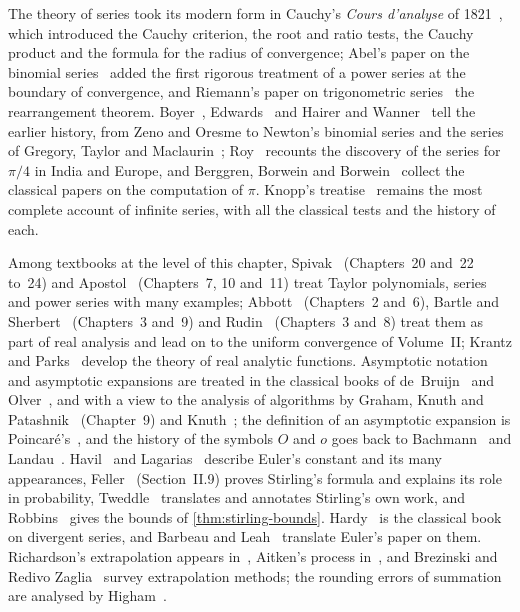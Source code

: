 The theory of series took its modern form in Cauchy's \emph{Cours d'analyse} of 1821~\cite{cauchy1821}, which introduced the Cauchy criterion, the root and ratio tests, the Cauchy product and the formula for the radius of convergence; Abel's paper on the binomial series~\cite{abel1826} added the first rigorous treatment of a power series at the boundary of convergence, and Riemann's paper on trigonometric series~\cite{riemann1867} the rearrangement theorem. Boyer~\cite{boyer1959}, Edwards~\cite{edwards1979} and Hairer and Wanner~\cite{hairer1996analysis} tell the earlier history, from Zeno and Oresme to Newton's binomial series and the series of Gregory, Taylor and Maclaurin~\cite{taylor1715,maclaurin1742}; Roy~\cite{roy1990} recounts the discovery of the series for $\pi/4$ in India and Europe, and Berggren, Borwein and Borwein~\cite{berggren2004pi} collect the classical papers on the computation of $\pi$. Knopp's treatise~\cite{knopp1990} remains the most complete account of infinite series, with all the classical tests and the history of each.

Among textbooks at the level of this chapter, Spivak~\cite{spivak2008calculus} (Chapters~20 and~22 to~24) and Apostol~\cite{apostol1967calculus} (Chapters~7, 10 and~11) treat Taylor polynomials, series and power series with many examples; Abbott~\cite{abbott2015} (Chapters~2 and~6), Bartle and Sherbert~\cite{bartle2011} (Chapters~3 and~9) and Rudin~\cite{rudin1976} (Chapters~3 and~8) treat them as part of real analysis and lead on to the uniform convergence of Volume~II; Krantz and Parks~\cite{krantz2002primer} develop the theory of real analytic functions. Asymptotic notation and asymptotic expansions are treated in the classical books of de~Bruijn~\cite{debruijn1981} and Olver~\cite{olver1997asymptotics}, and with a view to the analysis of algorithms by Graham, Knuth and Patashnik~\cite{graham1994concrete} (Chapter~9) and Knuth~\cite{knuth1976bigomega,knuth1997taocp1}; the definition of an asymptotic expansion is Poincar\'e's~\cite{poincare1886}, and the history of the symbols $O$ and $o$ goes back to Bachmann~\cite{bachmann1894} and Landau~\cite{landau1909}. Havil~\cite{havil2003gamma} and Lagarias~\cite{lagarias2013gamma} describe Euler's constant and its many appearances, Feller~\cite{feller1968} (Section~II.9) proves Stirling's formula and explains its role in probability, Tweddle~\cite{tweddle2003} translates and annotates Stirling's own work, and Robbins~\cite{robbins1955} gives the bounds of \cref{thm:stirling-bounds}. Hardy~\cite{hardy1949divergent} is the classical book on divergent series, and Barbeau and Leah~\cite{barbeau1976} translate Euler's paper on them. Richardson's extrapolation appears in~\cite{richardson1911}, Aitken's process in~\cite{aitken1926}, and Brezinski and Redivo Zaglia~\cite{brezinski1991} survey extrapolation methods; the rounding errors of summation are analysed by Higham~\cite{higham2002accuracy}.

\chapterreferences
